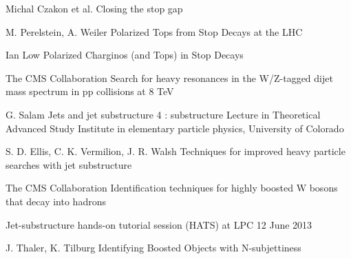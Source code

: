 \begin{thebibliography}{2}
             {Michal Czakon et al.}
             {Closing the stop gap}
             {}

             {M. Perelstein, A. Weiler}
             {Polarized Tops from Stop Decays at the LHC}
             {}

             {Ian Low}
             {Polarized Charginos (and Tops) in Stop Decays}
             {}


             {The CMS Collaboration}
             {Search for heavy resonances in the W/Z-tagged dijet mass
             spectrum in pp collisions at 8 TeV}
             {}

             {G. Salam}
             {Jets and jet substructure 4 : substructure}
             {Lecture in Theoretical Advanced Study Institute in elementary particle physics,
             University of Colorado}

             {S. D. Ellis, C. K. Vermilion, J. R. Walsh}
             {Techniques for improved heavy particle searches with jet substructure}
             {}

             {The CMS Collaboration}
             {Identification techniques for highly boosted W bosons that decay into hadrons}
             {}

             {}
             {Jet-substructure hands-on tutorial session (HATS) at LPC}
             {12 June 2013}

             {J. Thaler, K. Tilburg}
             {Identifying Boosted Objects with N-subjettiness}
             {}








\end{thebibliography}



